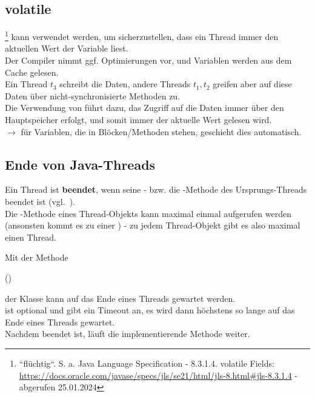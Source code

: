 \subsection*{volatile}
\footnote{``flüchtig``.
S. a. Java Language Specification - 8.3.1.4. volatile Fields: \url{https://docs.oracle.com/javase/specs/jls/se21/html/jls-8.html#jls-8.3.1.4} - abgerufen 25.01.2024
} kann verwendet werden, um sicherzustellen, dass ein Thread immer den aktuellen Wert der Variable liest.\\
Der Compiler nimmt ggf. Optimierungen vor, und Variablen werden aus dem Cache gelesen.\\
Ein Thread $t_3$ schreibt die Daten, andere Threads $t_1, t_2$ greifen aber auf diese Daten über nicht-synchronisierte Methoden zu.\\
Die Verwendung von  führt dazu, das Zugriff auf die Daten immer über den Hauptspeicher erfolgt, und somit immer der aktuelle Wert gelesen wird.\\

$\rightarrow$ für Variablen, die in  Blöcken/Methoden stehen, geschieht dies automatisch.

\subsection{Ende von Java-Threads}

Ein Thread ist \textbf{beendet}, wenn seine - bzw. die -Methode des Ursprungs-Threads beendet ist (vgl.~\cite[33]{Oec22}).\\

\noindent
Die -Methode eines Thread-Objekts kann maximal einmal aufgerufen werden (ansonsten kommt es zu einer ) - zu jedem Thread-Objekt gibt es also maximal einen Thread.

\noindent
Mit der Methode

\begin{center}
     ()
\end{center}

der Klasse  kann auf das Ende eines Threads gewartet werden.\\
 ist optional und gibt ein Timeout an, es wird dann höchstens so lange auf das Ende eines Threads gewartet.\\
Nachdem  beendet ist, läuft die implementierende Methode weiter.\\

